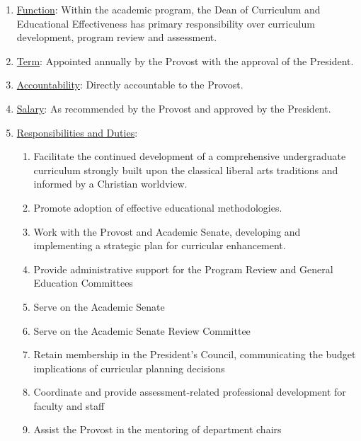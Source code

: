 					\begin{enumerate}
						\item{\underline{Function}:  Within the academic program, the Dean of Curriculum and Educational Effectiveness has primary responsibility over curriculum development, program review and assessment.}
						\item{\underline{Term}:  Appointed annually by the Provost with the approval of the President.}
						\item{\underline{Accountability}:  Directly accountable to the Provost.}
						\item{\underline{Salary}:  As recommended by the Provost and approved by the President.}
						\item{\underline{Responsibilities and Duties}:
							\begin{enumerate}
								\item{Facilitate the continued development of a comprehensive undergraduate curriculum strongly built upon the classical liberal arts traditions and informed by a Christian worldview.}
								\item{Promote adoption of effective educational methodologies.}
								\item{Work with the Provost and Academic Senate, developing and implementing a strategic plan for curricular enhancement.}
								\item{Provide administrative support for the Program Review and General Education Committees}
								\item{Serve on the Academic Senate}
								\item{Serve on the Academic Senate Review Committee}
								\item{ Retain membership in the President's Council, communicating the budget implications of curricular planning decisions}
								\item{ Coordinate and provide assessment-related professional development for faculty and staff}
								\item{ Assist the Provost in the mentoring of department chairs}
							\end{enumerate}
						}
					\end{enumerate}
